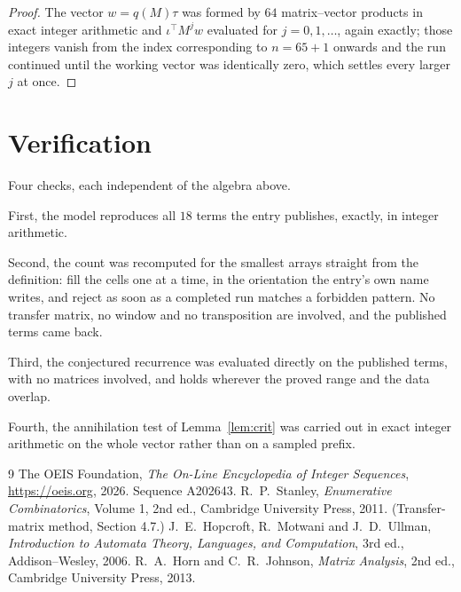 \documentclass[11pt,a4paper]{article}
\theoremstyle{plain}
\theoremstyle{definition}
\begin{document}
\begin{proof}
The vector $w=q(M)\tau$ was formed by $64$ matrix--vector products in exact integer
arithmetic and $\iota^{\!\top}M^{j}w$ evaluated for $j=0,1,\dots$, again exactly; those
integers vanish from the index corresponding to $n=65+1$ onwards and the run continued
until the working vector was identically zero, which settles every larger $j$ at once.
\end{proof}

\section{Verification}

Four checks, each independent of the algebra above.

First, the model reproduces all $18$ terms the entry publishes, exactly, in integer
arithmetic.

Second, the count was recomputed for the smallest arrays straight from the definition: fill the
cells one at a time, in the orientation the entry's own name writes, and reject as soon as a
completed run matches a forbidden pattern. No transfer matrix, no window and no transposition
are involved, and the published terms came back.

Third, the conjectured recurrence was evaluated directly on the published terms, with no
matrices involved, and holds wherever the proved range and the data overlap.

Fourth, the annihilation test of Lemma~\ref{lem:crit} was carried out in exact integer
arithmetic on the whole vector rather than on a sampled prefix.

\begin{thebibliography}{9}
 The OEIS Foundation, \emph{The On-Line Encyclopedia of Integer
Sequences}, \url{https://oeis.org}, 2026. Sequence A202643.
 R.~P.~Stanley, \emph{Enumerative Combinatorics}, Volume 1, 2nd ed.,
Cambridge University Press, 2011. (Transfer-matrix method, Section 4.7.)
 J.~E.~Hopcroft, R.~Motwani and J.~D.~Ullman, \emph{Introduction to Automata
Theory, Languages, and Computation}, 3rd ed., Addison--Wesley, 2006.
 R.~A.~Horn and C.~R.~Johnson, \emph{Matrix Analysis}, 2nd ed., Cambridge
University Press, 2013.
\end{thebibliography}
\end{document}
